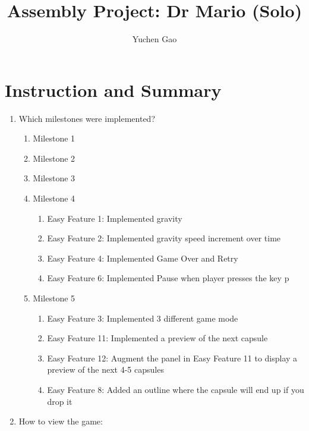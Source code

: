 \documentclass{article}
\title{Assembly Project: Dr Mario (Solo)}
\author{Yuchen Gao}
\begin{document}
\maketitle

\section{Instruction and Summary}

\begin{enumerate}

    \item Which milestones were implemented? 

    \begin{enumerate}

    \item Milestone 1
    \item Milestone 2
    \item Milestone 3
    \item Milestone 4
        \begin{enumerate}
        \item Easy Feature 1: Implemented gravity
        \item Easy Feature 2: Implemented gravity speed increment over time
        \item Easy Feature 4: Implemented Game Over and Retry
        \item Easy Feature 6: Implemented Pause when player presses the key p
        \end{enumerate}
    \item Milestone 5
        \begin{enumerate}
        \item Easy Feature 3: Implemented 3 different game mode
        \item Easy Feature 11: Implemented a preview of the next capsule
        \item Easy Feature 12: Augment the panel in Easy Feature 11 to display a preview of the next 4-5 capsules
        \item Easy Feature 8: Added an outline where the capsule will end up if you drop it
        \end{enumerate}
    \end{enumerate}
    

    \item How to view the game:
    
    
    

\end{enumerate}
\end{document}
